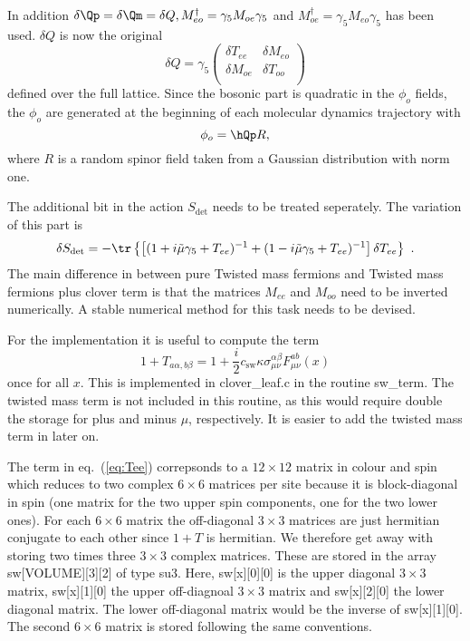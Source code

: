 In addition $\delta\Qp = \delta\Qm = \delta Q, M_{eo}^\dagger =
\gamma_5 M_{oe}\gamma_5$ and $M_{oe}^\dagger = \gamma_5
M_{eo}\gamma_5$ has been used.  $\delta Q$
is now the original
\[
\delta Q = \gamma_5
\begin{pmatrix}
  \delta T_{ee} & \delta M_{eo} \\
  \delta M_{oe} & \delta T_{oo} \\
\end{pmatrix}
\]
defined over the full lattice. Since the bosonic part
is quadratic in the $\phi_o$ fields, the $\phi_o$ are generated at the
beginning of each molecular dynamics trajectory with
\begin{equation}
  \label{eq:eosw10}
  \phi_o = \hQp R,
\end{equation}
where $R$ is a random spinor field taken from a Gaussian distribution
with norm one.

The additional bit in the action $S_{\det}$ needs to be treated
seperately. The variation of this part is
\begin{equation}
  \label{eq:eosw11}
  \delta S_{\det} = -\tr \left\{ \left[(1+i\tilde\mu\gamma_5 + T_{ee})^{-1}  +
    (1-i\tilde\mu\gamma_5 + T_{ee})^{-1}\right] \delta T_{ee} \right\} \ . 
\end{equation}
The main difference in between pure Twisted mass fermions and Twisted
mass fermions plus clover term is that the matrices $M_{ee}$ and
$M_{oo}$ need to be inverted numerically. A stable numerical method
for this task needs to be devised.

For the implementation it is useful to compute the term
\begin{equation}
  \label{eq:Tee}
  1+T_{a\alpha,b\beta} = 1 + \frac{i}{2} c_\mathrm{sw}
  \kappa\sigma_{\mu\nu}^{\alpha\beta}F_{\mu\nu}^{ab}(x)
\end{equation}  
once for all $x$. This is implemented in {\ttfamily clover\_leaf.c} in
the routine {\ttfamily sw\_term}. The twisted mass term is not
included in this routine, as this would require double the storage for
plus and minus $\mu$, respectively. It is easier to add the twisted
mass term in later on. 

The term in eq.~(\ref{eq:Tee}) correpsonds to a $12\times12$ matrix
in colour and spin which reduces to two complex $6\times6$ matrices
per site because it is block-diagonal in spin (one matrix for the two
upper spin components, one for the two lower ones). 
For each $6\times6$ matrix the off-diagonal $3\times3$
matrices are just hermitian conjugate to each other since $1+T$ is hermitian.
We therefore get away with storing two times three 
$3\times3$ complex matrices. These are stored in the array {\ttfamily
  sw[VOLUME][3][2]} of type {\ttfamily su3}. Here, {\ttfamily
  sw[x][0][0]} is the upper diagonal $3\times3$ matrix, {\ttfamily
  sw[x][1][0]} the upper off-diagnoal $3\times3$ matrix and {\ttfamily
  sw[x][2][0]} the lower diagonal matrix. The lower off-diagonal
matrix would be the inverse of {\ttfamily sw[x][1][0]}. The second
$6\times6$ matrix is stored following the same conventions.


